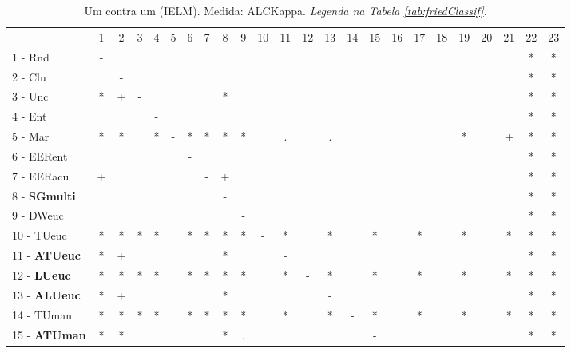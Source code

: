 \begin{table}[h]
\caption{Um contra um (IELM). Medida: ALCKappa. \textit{Legenda na Tabela \ref{tab:friedClassif}.}}
\begin{center}\begin{tabular}{lcc|cc|cc|cc|cc|cc|cc|cc|cc|cc|cc|c}
 			& 1 & 2 & 3 & 4 & 5 & 6 & 7 & 8 & 9 & 10 & 11 & 12 & 13 & 14 & 15 & 16 & 17 & 18 & 19 & 20 & 21 & 22 & 23\\
1 - Rnd  	& - &   &   &   &   &   &   &   &   &   &   &   &   &   &   &   &   &   &   &   &   & * & * \\
2 - Clu  	&   & - &   &   &   &   &   &   &   &   &   &   &   &   &   &   &   &   &   &   &   & * & * \\ \hline
3 - Unc  	& * & + & - &   &   &   &   & * &   &   &   &   &   &   &   &   &   &   &   &   &   & * & * \\
4 - Ent  	&   &   &   & - &   &   &   &   &   &   &   &   &   &   &   &   &   &   &   &   &   & * & * \\ \hline
5 - Mar  	& * & * &   & * & - & * & * & * & * &   & . &   & . &   &   &   &   &   & * &   & + & * & * \\
6 - EERent	&   &   &   &   &   & - &   &   &   &   &   &   &   &   &   &   &   &   &   &   &   & * & * \\ \hline
7 - EERacu	& + &   &   &   &   &   & - & + &   &   &   &   &   &   &   &   &   &   &   &   &   & * & * \\
8 - \textbf{SGmulti}	&   &   &   &   &   &   &   & - &   &   &   &   &   &   &   &   &   &   &   &   &   & * & * \\ \hline
9 - DWeuc	&   &   &   &   &   &   &   &   & - &   &   &   &   &   &   &   &   &   &   &   &   & * & * \\
10 - TUeuc	& * & * & * & * &   & * & * & * & * & - & * &   & * &   & * &   & * &   & * &   & * & * & * \\ \hline
11 - \textbf{ATUeuc}	& * & + &   &   &   &   &   & * &   &   & - &   &   &   &   &   &   &   &   &   &   & * & * \\
12 - \textbf{LUeuc}	& * & * & * & * &   & * & * & * & * &   & * & - & * &   & * &   & * &   & * &   & * & * & * \\ \hline
13 - \textbf{ALUeuc}	& * & + &   &   &   &   &   & * &   &   &   &   & - &   &   &   &   &   &   &   &   & * & * \\
14 - TUman	& * & * & * & * &   & * & * & * & * &   & * &   & * & - & * &   & * &   & * &   & * & * & * \\ \hline
15 - \textbf{ATUman}	& * & * &   &   &   &   &   & * & . &   &   &   &   &   & - &   &   &   &   &   &   & * & * \\

\end{tabular}
\end{center}
\end{table}
